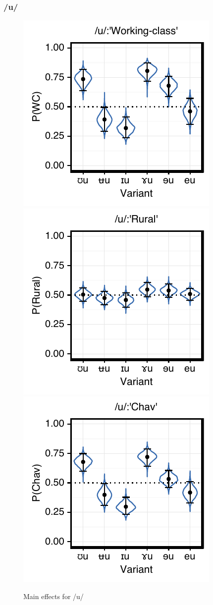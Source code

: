 \documentclass[PWPL]{article}
\begin{document}
\subsubsection{/u/}
\begin{figure}[ht]
\centering
\caption{Main effects for /u/}
\includegraphics[scale=0.65]{uw_class.pdf}
\includegraphics[scale=0.65]{uw_local.pdf}
\includegraphics[scale=0.65]{uw_chav.pdf}
\end{figure}
\end{document}
